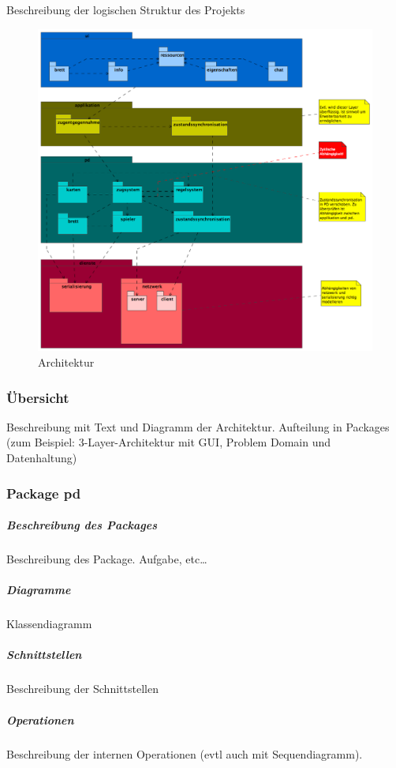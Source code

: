 \documentclass[a4paper,12pt,halfparskip,DIV14]{scrartcl}
\begin{document}
\newpage
Beschreibung der logischen Struktur des Projekts
\begin{figure}
	[htp] \centering 
	\includegraphics[width=1\textwidth]{Architektur.png} \caption{Architektur}\label{fig:Architektur.png} 
\end{figure}

\newpage
\subsubsection{Übersicht} %
\label{ssub:Übersicht}
Beschreibung mit Text und Diagramm der Architektur. Aufteilung in Packages (zum Beispiel: 3-Layer-Architektur mit  GUI, Problem Domain und Datenhaltung)

\subsubsection{Package pd} %
\label{ssub:package_pd}
\subparagraph{Beschreibung des Packages} %
\label{ssub:beschreibung_des_packages}
Beschreibung des Package. Aufgabe, etc…
\subparagraph{Diagramme} %
\label{ssub:diagramme}
Klassendiagramm
\subparagraph{Schnittstellen} %
\label{ssub:schnittstellen}
Beschreibung der Schnittstellen
\subparagraph{Operationen} %
\label{ssub:operationen}
Beschreibung der internen Operationen (evtl auch mit Sequendiagramm).
\end{document}
